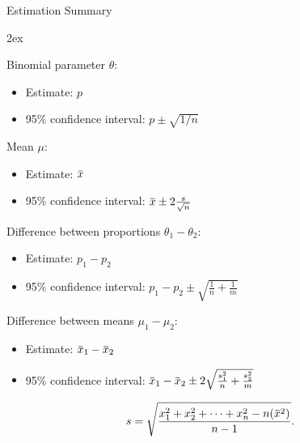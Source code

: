 \documentclass[10pt, handout, xcolor=table]{beamer}
\newcommand{\overbar}[1]{\mkern 1.5mu\overline{\mkern-1.5mu#1\mkern-1.5mu}\mkern 1.5mu}
\begin{document}
\begin{frame}{Estimation Summary}
\begin{itemize}\itemsep2ex
\vspace*{2ex}
\item Binomial parameter $\theta$:
\begin{itemize}
\item[] Estimate: $p$
\item[] 95\% confidence interval: $p \pm \sqrt{1/n}$
\end{itemize}
\item Mean $\mu$:
\begin{itemize}
\item[] Estimate: $\overbar{x}$
\item[] 95\% confidence interval: $\overbar{x} \pm 2\frac{s}{\sqrt{n}}$
\end{itemize}
\item Difference between proportions $\theta_1 - \theta_2$:
\begin{itemize}
\item[] Estimate: $p_1 - p_2$
\item[] 95\% confidence interval: ${p_1 - p_2 \pm  \sqrt{ \frac{1}{n} +  \frac{1}{m}}}$
\end{itemize}
\item Difference between means $\mu_1 - \mu_2$:
\begin{itemize}
\item[] Estimate: $\overbar{x}_1 - \overbar{x}_2$
\item[] 95\% confidence interval: $\overbar{x}_1 - \overbar{x}_2 \pm 2 \sqrt{\frac{s_1^2}{n} + \frac{s_2^2}{m}}$
\end{itemize}
\vspace*{1ex}
{\footnotesize \item[Note:] $$s = \sqrt{\frac{x_1^2  + x_2^2 + \cdots + x_n^2 - n(\overbar{x}^2)}{{ n-1}}}.$$}
\end{itemize}
\end{frame}
\end{document}
